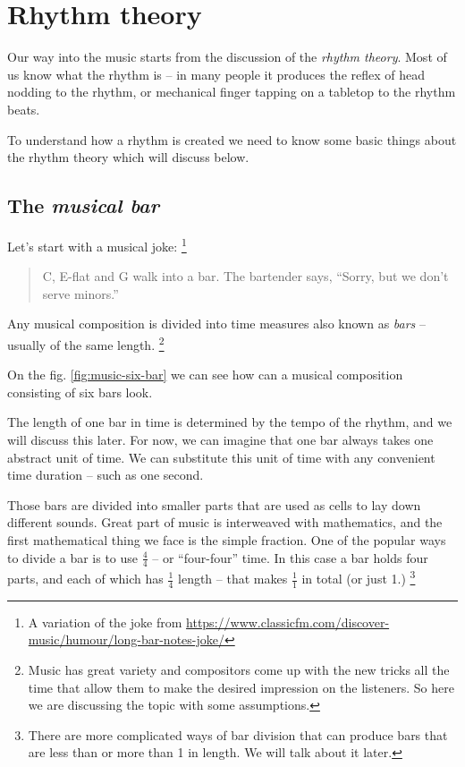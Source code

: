 \documentclass[../sparc.tex]{subfiles}
\begin{document}
\newpage
\section{Rhythm theory}

Our way into the music starts from the discussion of the \emph{rhythm theory}.
Most of us know what the rhythm is -- in many people it produces the reflex of
head nodding to the rhythm, or mechanical finger tapping on a tabletop to the
rhythm beats.

To understand how a rhythm is created we need to know some basic things about
the rhythm theory which will discuss below.

\subsection{The \emph{musical bar}}

Let's start with a musical joke: \footnote{A variation of the joke from
\url{https://www.classicfm.com/discover-music/humour/long-bar-notes-joke/}}

\begin{quotation}
C, E-flat and G walk into a bar.  The bartender says, ``Sorry, but we don’t
serve minors.''
\end{quotation}

Any musical composition is divided into time measures also known as \emph{bars}
-- usually of the same length. \footnote{Music has great variety and compositors
come up with the new tricks all the time that allow them to make the desired
impression on the listeners.  So here we are discussing the topic with some
assumptions.}

On the fig. \ref{fig:music-six-bar} we can see how can a musical composition
consisting of six bars look.


The length of one bar in time is determined by the tempo of the rhythm, and we
will discuss this later.  For now, we can imagine that one bar always takes one
abstract unit of time.  We can substitute this unit of time with any convenient
time duration -- such as one second.

Those bars are divided into smaller parts that are used as cells to lay down
different sounds.  Great part of music is interweaved with mathematics, and the
first mathematical thing we face is the simple fraction.  One of the popular
ways to divide a bar is to use $\frac{4}{4}$ -- or ``four-four'' time.  In this
case a bar holds four parts, and each of which has $\frac{1}{4}$ length -- that
makes $\frac{1}{1}$ in total (or just 1.)  \footnote{There are more complicated
ways of bar division that can produce bars that are less than or more than 1 in
length.  We will talk about it later.}
\end{document}
